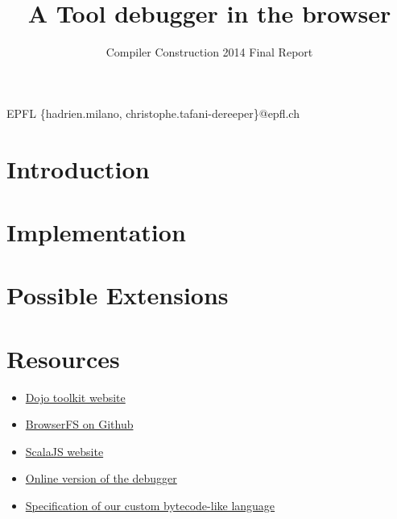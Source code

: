 \documentclass[nocopyrightspace,11pt,authoryear,preprint]{sigplanconf}
\begin{document}


\title{A Tool debugger in the browser}
\subtitle{Compiler Construction 2014 Final Report}

           {EPFL}
           {\{hadrien.milano, christophe.tafani-dereeper\}@epfl.ch}

\maketitle

\section{Introduction}


%

\section{Implementation}


\section{Possible Extensions}


\section{Resources}
\begin{itemize}
\item \href{http://dojotoolkit.org}{Dojo toolkit website}
\item \href{https://github.com/jvilk/BrowserFS}{BrowserFS on Github}
\item \href{http://www.scala-js.org/}{ScalaJS website}
\item \href{http://vps.christophetd.fr/tool_dbg/}{Online version of the debugger}
\item \href{https://github.com/hmil/tool_dbg/blob/master/ASM_definition.md}{Specification of our custom bytecode-like language}

\end{itemize}
\end{document}
